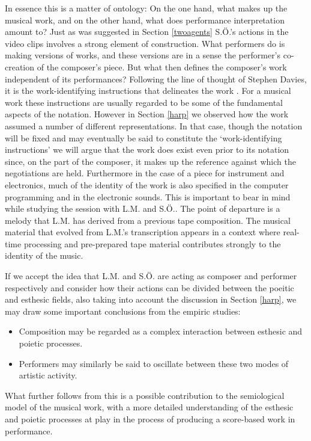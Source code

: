\documentclass[10pt,letterpaper]{article}
\begin{document}
In essence this is a matter of ontology: On the one hand, what makes up
the musical work, and on the other hand, what does performance
interpretation amount to? Just as was suggested in Section
\ref{twoagents} S.{\"O}.'s actions in the video clips involves a strong
element of construction. What performers do is making versions of works,
and these versions are in a sense the performer's co-creation of the
composer's piece.\footnotemark {} But what
then defines the composer's work independent of its performances?
Following the line of thought of Stephen Davies, it is the
work-identifying instructions that delineates the work
\cite{davies}. For a musical work these instructions are usually
regarded to be some of the fundamental aspects of the notation. However
in Section \ref{harp} we observed how the work assumed a number of
different representations. In that case, though the notation will be
fixed and may eventually be said to constitute the `work-identifying
instructions' we will argue that the work does exist even prior to its
notation since, on the part of the composer, it makes up the reference
against which the negotiations are held. Furthermore in the case of a
piece for instrument and electronics, much of the identity of the work
is also specified in the computer programming and in the electronic
sounds. This is important to bear in mind while studying the session
with L.M. and S.{\"O}.. The point of departure is a melody that L.M. has
derived from a previous tape composition. The musical material that
evolved from L.M.'s transcription appears in a context where real-time
processing and pre-prepared tape material contributes strongly to the
identity of the music.

If we accept the idea that L.M. and S.{\"O}. are acting as composer and
performer respectively and consider how their actions can be divided
between the poeitic and esthesic fields, also taking into account the
discussion in Section \ref{harp}, we may draw some important conclusions
from the empiric studies:
\begin{itemize}
\item Composition may be regarded as a complex interaction between
      esthesic and poietic processes.
\item Performers may similarly be said to oscillate between these two
      modes of artistic activity.
\end{itemize}
What further follows from this is a possible contribution to the
semiological model of the musical work, with a more detailed
understanding of the esthesic and poietic processes at play in the
process of producing a score-based work in performance.
\end{document}
